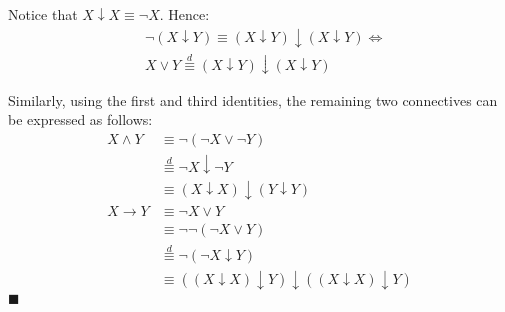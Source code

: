 \documentclass[12pt]{article}
\newcommand{\q}{\hfill $\blacksquare$}
\newenvironment{ps}
{\begin{enumerate}[leftmargin=0em, itemindent=1.5em]}
{\end{enumerate}}
\begin{document}
\begin{ps}
        Notice that \( X \downarrow X \equiv \neg X \). Hence: 
        \begin{align*}
            &\neg (X \downarrow Y) \equiv (X \downarrow Y) \downarrow (X \downarrow Y) \Leftrightarrow \\
            &X \vee Y \overset{d}{\equiv} (X \downarrow Y) \downarrow (X \downarrow Y)
        \end{align*}

        Similarly, using the first and third identities, the remaining two connectives can be
        expressed as follows: 
        \begin{align*}
            X \wedge Y &\equiv \neg (\neg X \vee \neg Y) \\
                     &\overset{d}{\equiv} \neg X \downarrow \neg Y \\
                     &\equiv (X \downarrow X) \downarrow (Y \downarrow Y) \\
            X \rightarrow Y &\equiv \neg X \vee Y \\
                            &\equiv \neg \neg (\neg X \vee Y) \\
                            &\overset{d}{\equiv} \neg (\neg X \downarrow Y)\\
                            &\equiv ((X \downarrow X) \downarrow Y) \downarrow ((X \downarrow X)
                            \downarrow Y)
        \end{align*} \q

\end{ps}
\end{document}
